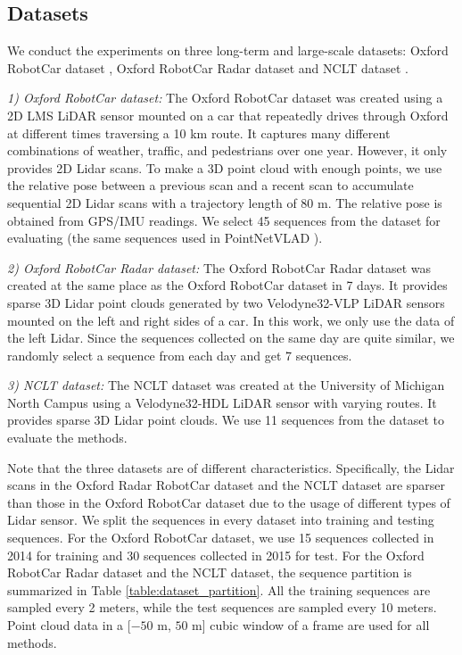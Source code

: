\documentclass[letterpaper, 10 pt, journal, twoside]{IEEEtran}
\begin{document}
\subsection{Datasets}
We conduct the experiments on three long-term and large-scale datasets: Oxford RobotCar dataset \cite{barnes2020oxford}, Oxford RobotCar Radar dataset \cite{maddern20171} and NCLT dataset \cite{2016University}. 

\emph{1) Oxford RobotCar dataset:} The Oxford RobotCar dataset was created using a 2D LMS LiDAR sensor mounted on a car that repeatedly drives through Oxford at different times traversing a 10 km route. It captures many different combinations of weather, traffic, and pedestrians over one year. However, it only provides 2D Lidar scans. To make a 3D point cloud with enough points, we use the relative pose between a previous scan and a recent scan to accumulate sequential 2D Lidar scans with a trajectory length of 80 m. The relative pose is obtained from GPS/IMU readings. We select 45 sequences from the dataset for evaluating (the same sequences used in PointNetVLAD \cite{angelina2018pointnetvlad}). 

\emph{2) Oxford RobotCar Radar dataset:} The Oxford RobotCar Radar dataset was created at the same place as the Oxford RobotCar dataset in 7 days. It provides sparse 3D Lidar point clouds generated by two Velodyne32-VLP LiDAR sensors mounted on the left and right sides of a car. In this work, we only use the data of the left Lidar. Since the sequences collected on the same day are quite similar, we randomly select a sequence from each day and get 7 sequences.

\emph{3) NCLT dataset:} The NCLT dataset was created at the University of Michigan North Campus using a Velodyne32-HDL LiDAR sensor with varying routes. It provides sparse 3D Lidar point clouds. We use 11 sequences from the dataset to evaluate the methods.

Note that the three datasets are of different characteristics. Specifically, the Lidar scans in the Oxford Radar RobotCar dataset and the NCLT dataset are sparser than those in the Oxford RobotCar dataset due to the usage of different types of Lidar sensor. We split the sequences in every dataset into training and testing sequences. For the Oxford RobotCar dataset, we use 15 sequences collected in 2014 for training and 30 sequences collected in 2015 for test. For the Oxford RobotCar Radar dataset and the NCLT dataset, the sequence partition is summarized in Table \ref{table:dataset_partition}. All the training sequences are sampled every 2 meters, while the test sequences are sampled every 10 meters. Point cloud data in a [$-50 $ m, $ 50 $ m] cubic window of a frame are used for all methods. 
\end{document}
